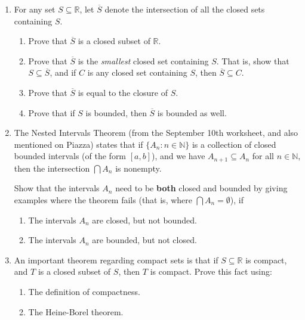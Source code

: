 \documentclass[letterpaper,12pt]{article}
\newcommand{\R}{\mathbb{R}}
\begin{document}
\begin{enumerate}
{\em Hint:} use the fact that $\mathbb{Q}$ is dense in $\R$.
\newpage

{\bf Note:} For problems 4-6, you only need to submit {\bf two} of the three problems -- you're allowed to skip one.

\bigskip

\item For any set $S\subseteq \R$, let $\overline{S}$ denote the intersection of all the closed sets containing $S$.
\begin{enumerate}
 \item Prove that $\overline{S}$ is a closed subset of $\R$.
 \item Prove that $\overline{S}$ is the {\em smallest} closed set containing $S$. That is, show that $S\subseteq \overline{S}$, and if $C$ is any closed set containing $S$, then $\overline{S}\subseteq C$.
 \item Prove that $\overline{S}$ is equal to the closure of $S$.
 \item Prove that if $S$ is bounded, then $\overline{S}$ is bounded as well.
\end{enumerate}

\item The Nested Intervals Theorem (from the September 10th worksheet, and also mentioned on Piazza) states that if $\{A_n : n\in \mathbb{N}\}$ is a collection of closed bounded intervals (of the form $[a,b]$), and we have $A_{n+1}\subseteq A_n$ for all $n\in\mathbb{N}$, then the intersection $\bigcap A_n$ is nonempty.

Show that the intervals $A_n$ need to be {\bf both} closed and bounded by giving examples where the theorem fails (that is, where $\bigcap A_n =\emptyset$), if
\begin{enumerate}
 \item The intervals $A_n$ are closed, but not bounded.
 \item The intervals $A_n$ are bounded, but not closed.
\end{enumerate}

\item An important theorem regarding compact sets is that if $S\subseteq \R$ is compact, and $T$ is a closed subset of $S$, then $T$ is compact. Prove this fact using:
\begin{enumerate}
 \item The definition of compactness.
 \item The Heine-Borel theorem.
\end{enumerate}



\end{enumerate}
\end{document}

